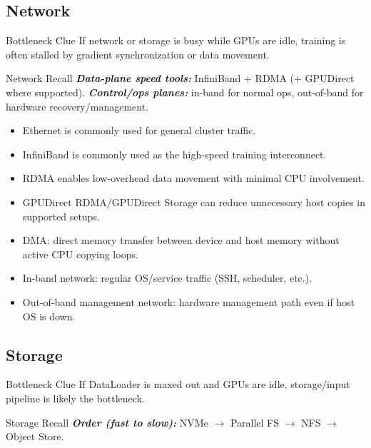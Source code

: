 \documentclass[12pt]{article}
\let\origtextbf\textbf
\renewcommand{\textbf}[1]{\origtextbf{\textit{#1}}}
\begin{document}
\subsection{Network}

\begin{redbox}{Bottleneck Clue}
If network or storage is busy while GPUs are idle, training is often stalled by gradient synchronization or data movement.
\end{redbox}

\begin{bluebox}{Network Recall}
\textbf{Data-plane speed tools:} InfiniBand + RDMA (+ GPUDirect where supported).  
\textbf{Control/ops planes:} in-band for normal ops, out-of-band for hardware recovery/management.
\end{bluebox}

\begin{itemize}
\item Ethernet is commonly used for general cluster traffic.
\item InfiniBand is commonly used as the high-speed training interconnect.
\item RDMA enables low-overhead data movement with minimal CPU involvement.
\item GPUDirect RDMA/GPUDirect Storage can reduce unnecessary host copies in supported setups.
\item DMA: direct memory transfer between device and host memory without active CPU copying loops.
\item In-band network: regular OS/service traffic (SSH, scheduler, etc.).
\item Out-of-band management network: hardware management path even if host OS is down.
\end{itemize}

\subsection{Storage}

\begin{redbox}{Bottleneck Clue}
If DataLoader is maxed out and GPUs are idle, storage/input pipeline is likely the bottleneck.
\end{redbox}

\begin{bluebox}{Storage Recall}
\textbf{Order (fast to slow):} NVMe $\rightarrow$ Parallel FS $\rightarrow$ NFS $\rightarrow$ Object Store.
\end{bluebox}
\end{document}
